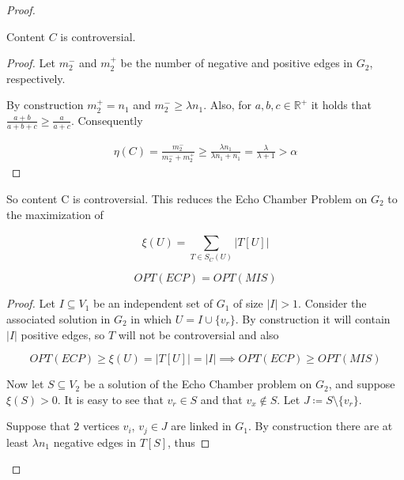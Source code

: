 \begin{proof}
	\begin{claim}
		\label{th:claim-controversial}
		Content $C$ is controversial.
	\end{claim}
	\begin{proof}
		Let $m_{2}^{-} $ and $m_{2}^{+} $ be the number of negative and
		positive edges in $G_2$, respectively.

		By construction $m_{2}^{+} = n_{1} $ and $m_{2}^{-} \geq \lambda n_{1}
		$. Also, for $a, b, c \in \mathbb{R}^{+}$ it holds that $\frac{a +
				b}{a + b + c} \geq \frac{a}{a + c} $. Consequently

		\begin{align}
			\eta(C) = \frac{m_{2}^{-} }{m_{2}^{-} +
				m_{2}^{+} } \geq \frac{\lambda n_{1}}{\lambda n_{1}
				+ n_{1} } = \frac{\lambda }{\lambda + 1} > \alpha
		\end{align}
	\end{proof}

	So content C is controversial. This reduces the Echo Chamber Problem on $G_2$ to the maximization of

	\begin{equation}
		\label{eq:score}
		\xi(U) = \sum^{}_{T \in S_{C}(U) } | T[U] |
	\end{equation}

	\begin{claim}
		\label{th:opt-equality}
		\begin{equation}
			OPT(ECP) = OPT(MIS)
		\end{equation}
	\end{claim}

	\begin{proof}
		Let $I \subseteq V_{1} $ be an independent set of $G_1$ of size $|I| >
			1$. Consider the associated solution in $G_2$ in which $U = I
			\cup \{v_{r} \}$. By construction it will contain $|I|$ positive
		edges, so $T$ will not be controversial and also

		\begin{equation}
			OPT(ECP) \geq \xi(U) = |T[U]| = |I| \implies OPT(ECP) \geq OPT(MIS)
		\end{equation}

		Now let $S \subseteq V_2$ be a solution of the Echo Chamber problem on
		$G_2$, and suppose $\xi(S) > 0$. It is easy to see that $v_{r} \in S$
		and that $v_{x} \not\in S $. Let $J \coloneqq S \setminus \{v_r\}$.

		Suppose that $2$ vertices $v_{i} $, $v_{j} \in J$ are linked in
		$G_1$. By construction there are at least $\lambda n_1$ negative edges
		in $T[S]$, thus


\end{proof}
\end{proof}
